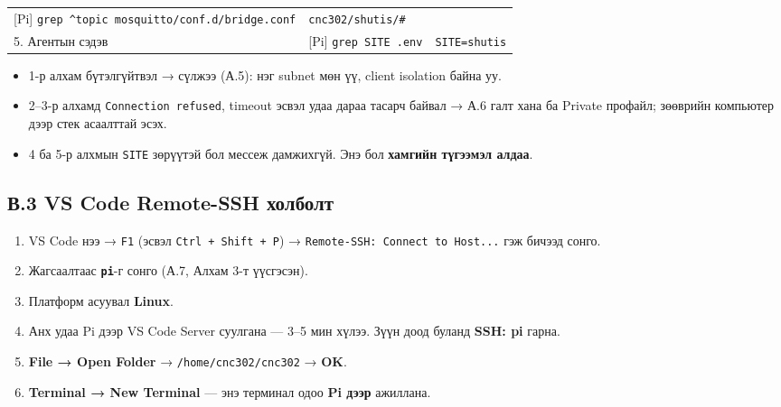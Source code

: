 \begin{longtable}[]{@{}lll@{}}
\begin{minipage}[t]{0.30\columnwidth}
{[}Pi{]} \texttt{grep\ \textquotesingle{}\^{}topic\textquotesingle{}\ mosquitto/conf.d/bridge.conf}\strut
\end{minipage} & \begin{minipage}[t]{0.30\columnwidth}\raggedright
\texttt{cnc302/shutis/\#}\strut
\end{minipage}\tabularnewline
\begin{minipage}[t]{0.30\columnwidth}\raggedright
5. Агентын сэдэв\strut
\end{minipage} & \begin{minipage}[t]{0.30\columnwidth}\raggedright
{[}Pi{]} \texttt{grep\ SITE\ .env}\strut
\end{minipage} & \begin{minipage}[t]{0.30\columnwidth}\raggedright
\texttt{SITE=shutis}\strut
\end{minipage}\tabularnewline
\bottomrule
\end{longtable}\endgroup

\begin{itemize}
\tightlist
\item
  1-р алхам бүтэлгүйтвэл → сүлжээ (А.5): нэг subnet мөн үү, client isolation байна уу.
\item
  2--3-р алхамд \texttt{Connection\ refused}, timeout эсвэл удаа дараа тасарч байвал → А.6 галт хана ба Private профайл; зөөврийн компьютер дээр стек асаалттай эсэх.
\item
  4 ба 5-р алхмын \texttt{SITE} зөрүүтэй бол мессеж дамжихгүй. Энэ бол \textbf{хамгийн түгээмэл алдаа}.
\end{itemize}

\hypertarget{ux432.3-vs-code-remote-ssh-ux445ux43eux43bux431ux43eux43bux442}{%
\subsection{В.3 VS Code Remote-SSH холболт}\label{ux432.3-vs-code-remote-ssh-ux445ux43eux43bux431ux43eux43bux442}}

\begin{enumerate}
\def\labelenumi{\arabic{enumi}.}
\tightlist
\item
  VS Code нээ → \texttt{F1} (эсвэл \texttt{Ctrl\ +\ Shift\ +\ P}) → \texttt{Remote-SSH:\allowbreak{}\ Connect\ to\ Host.\allowbreak{}.\allowbreak{}.\allowbreak{}} гэж бичээд сонго.
\item
  Жагсаалтаас \textbf{\texttt{pi}}-г сонго (А.7, Алхам 3-т үүсгэсэн).
\item
  Платформ асуувал \textbf{Linux}.
\item
  Анх удаа Pi дээр VS Code Server суулгана --- 3--5 мин хүлээ. Зүүн доод буланд \textbf{SSH: pi} гарна.
\item
  \textbf{File → Open Folder} → \texttt{/\allowbreak{}home/\allowbreak{}cnc302/\allowbreak{}cnc302} → \textbf{OK}.
\item
  \textbf{Terminal → New Terminal} --- энэ терминал одоо \textbf{Pi дээр} ажиллана.
\end{enumerate}

